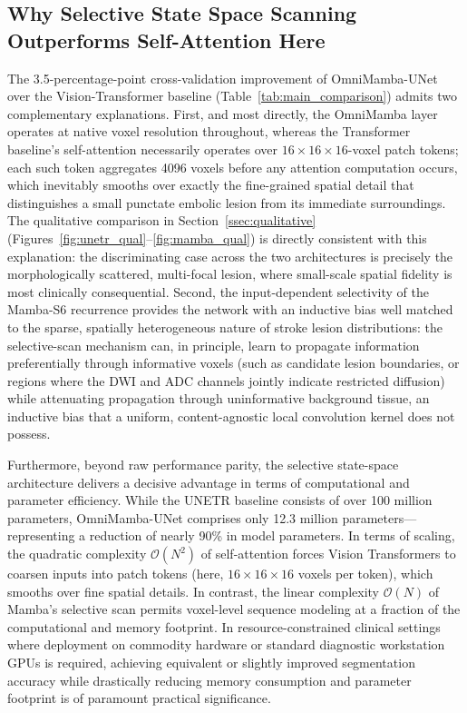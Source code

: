 \documentclass[pdflatex,sn-mathphys-num]{sn-jnl}
\begin{document}
\subsection{Why Selective State Space Scanning Outperforms Self-Attention Here}\label{ssec:why}
The 3.5-percentage-point cross-validation improvement of OmniMamba-UNet
over the Vision-Transformer baseline (Table~\ref{tab:main_comparison})
admits two complementary explanations. First, and most directly, the
OmniMamba layer operates at native voxel resolution throughout,
whereas the Transformer baseline's self-attention necessarily operates
over $16 \times 16 \times 16$-voxel patch tokens; each such token aggregates 4096 voxels
before any attention computation occurs, which inevitably smooths over
exactly the fine-grained spatial detail that distinguishes a small
punctate embolic lesion from its immediate surroundings. The
qualitative comparison in Section~\ref{ssec:qualitative}
(Figures~\ref{fig:unetr_qual}--\ref{fig:mamba_qual}) is directly
consistent with this explanation: the discriminating case across the
two architectures is precisely the morphologically scattered,
multi-focal lesion, where small-scale spatial fidelity is most
clinically consequential. Second, the input-dependent selectivity of
the Mamba-S6 recurrence provides the network with an inductive bias
well matched to the sparse, spatially heterogeneous nature of stroke
lesion distributions: the selective-scan mechanism can, in principle,
learn to propagate information preferentially through informative
voxels (such as candidate lesion boundaries, or regions where the DWI and
ADC channels jointly indicate restricted diffusion) while
attenuating propagation through uninformative background tissue, an
inductive bias that a uniform, content-agnostic local convolution
kernel does not possess.

Furthermore, beyond raw performance parity, the selective state-space architecture delivers a decisive advantage in terms of computational and parameter efficiency. While the UNETR baseline consists of over 100 million parameters, OmniMamba-UNet comprises only 12.3 million parameters—representing a reduction of nearly 90\% in model parameters. In terms of scaling, the quadratic complexity $\mathcal{O}(N^2)$ of self-attention forces Vision Transformers to coarsen inputs into patch tokens (here, $16 \times 16 \times 16$ voxels per token), which smooths over fine spatial details. In contrast, the linear complexity $\mathcal{O}(N)$ of Mamba's selective scan permits voxel-level sequence modeling at a fraction of the computational and memory footprint. In resource-constrained clinical settings where deployment on commodity hardware or standard diagnostic workstation GPUs is required, achieving equivalent or slightly improved segmentation accuracy while drastically reducing memory consumption and parameter footprint is of paramount practical significance.
\end{document}
